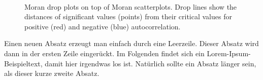 \begin{figure}[tbp]
\centering
{}\\
\caption{Moran drop plots on top of Moran scatterplots. Drop lines show the distances of significant values (points) from their critical values for positive (red) and negative (blue) autocorrelation.} \label{fig:2}
\end{figure}

Einen neuen Absatz erzeugt man einfach durch eine Leerzeile. Dieser Absatz wird dann in der ersten Zeile eingerückt. Im Folgenden findet sich ein Lorem-Ipsum-Beispieltext, damit hier irgendwas los ist. Natürlich sollte ein Absatz länger sein, als dieser kurze zweite Absatz.

\lipsum[1-20]